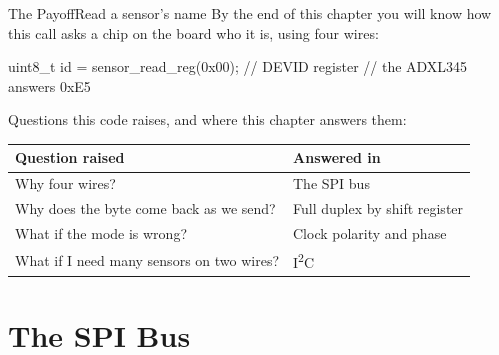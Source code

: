 \documentclass[9pt,aspectratio=169,xcolor=table]{beamer}
\begin{document}
{\beamerextras
\begin{frame}[fragile]{The Payoff}{Read a sensor's name}
    \leavevmode
    By the end of this chapter you will know how this call asks a chip on the board who it is, using four wires:

    \vspace{2mm}
    \begin{center}
    \begin{minipage}{.9\textwidth}
\begin{cc}[basicstyle=\ttfamily\small]
uint8_t id = sensor_read_reg(0x00);    // DEVID register
// the ADXL345 answers 0xE5
\end{cc}
    \end{minipage}
    \end{center}

    \vspace{2mm}
    {\small Questions this code raises, and where this chapter answers them:}

    \vspace{1mm}
    \begin{center}
    {\small
    \striped
    \begin{tabular}{@{}l R{.52\textwidth}@{}}
        \toprule
        \textbf{Question raised} & \textbf{Answered in} \\
        \midrule
        Why four wires? & The SPI bus \\
        Why does the byte come back as we send? & Full duplex by shift register \\
        What if the mode is wrong? & Clock polarity and phase \\
        What if I need many sensors on two wires? & I\textsuperscript{2}C \\
        \bottomrule
    \end{tabular}}
    \end{center}
\end{frame}
}


\section{The SPI Bus}
\end{document}
